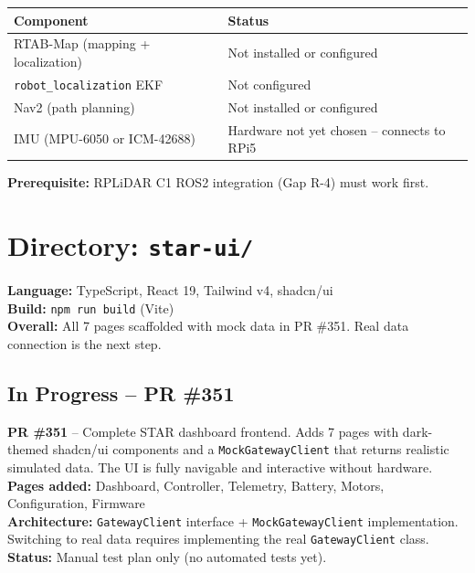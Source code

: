\documentclass[12pt,a4paper]{article}
\newcommand{\inprogress}[1]{\textcolor{prpurple}{\textbf{PR \##1}}}
\begin{document}
\begin{center}
\small
\begin{tabular}{L{5cm}L{9cm}}
  \toprule
  \textbf{Component} & \textbf{Status} \\
  \midrule
  RTAB-Map (mapping + localization) & Not installed or configured \\
  \texttt{robot\_localization} EKF & Not configured \\
  Nav2 (path planning) & Not installed or configured \\
  IMU (MPU-6050 or ICM-42688) & Hardware not yet chosen -- connects to RPi5 \\
  \bottomrule
\end{tabular}
\end{center}

\textbf{Prerequisite:} RPLiDAR C1 ROS2 integration (Gap R-4) must work first.

\newpage

\section{Directory: \texttt{star-ui/}}

\begin{dirbox}
  \textbf{Language:} TypeScript, React 19, Tailwind v4, shadcn/ui\\
  \textbf{Build:} \texttt{npm run build} (Vite)\\
  \textbf{Overall:} All 7 pages scaffolded with mock data in PR \#351. Real data connection is the next step.
\end{dirbox}

\subsection{In Progress -- PR \#351}

\begin{prbox}
  \textbf{\inprogress{351}} -- Complete STAR dashboard frontend. Adds 7 pages with dark-themed
  shadcn/ui components and a \texttt{MockGatewayClient} that returns realistic simulated data.
  The UI is fully navigable and interactive without hardware.\\[4pt]
  \textbf{Pages added:} Dashboard, Controller, Telemetry, Battery, Motors, Configuration, Firmware\\[4pt]
  \textbf{Architecture:} \texttt{GatewayClient} interface + \texttt{MockGatewayClient} implementation.
  Switching to real data requires implementing the real \texttt{GatewayClient} class.\\[4pt]
  \textbf{Status:} Manual test plan only (no automated tests yet).
\end{prbox}
\end{document}
